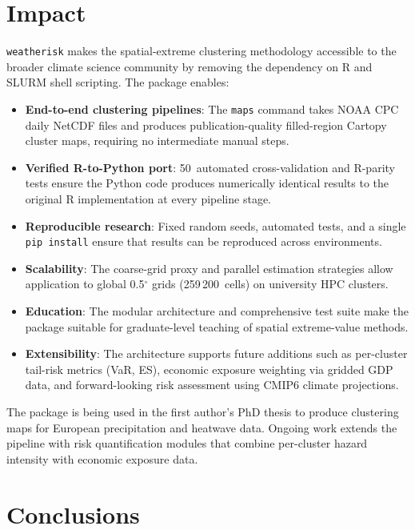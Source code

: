 \documentclass[a4paper]{elsarticle}
\begin{document}
\section{Impact}
\label{sec:impact}

\texttt{weatherisk} makes the spatial-extreme clustering methodology
accessible to the broader climate science community by removing the
dependency on R and SLURM shell scripting.
The package enables:

\begin{itemize}
\item \textbf{End-to-end clustering pipelines}: The \texttt{maps}
  command takes NOAA CPC daily NetCDF files and produces
  publication-quality filled-region Cartopy cluster maps,
  requiring no intermediate manual steps.
\item \textbf{Verified R-to-Python port}: 50~automated
  cross-validation and R-parity tests ensure the Python code
  produces numerically identical results to the original R
  implementation at every pipeline stage.
\item \textbf{Reproducible research}: Fixed random seeds, automated
  tests, and a single \texttt{pip install} ensure that results can
  be reproduced across environments.
\item \textbf{Scalability}: The coarse-grid proxy and parallel
  estimation strategies allow application to global 0.5$^\circ$
  grids (259\,200~cells) on university HPC clusters.
\item \textbf{Education}: The modular architecture and comprehensive
  test suite make the package suitable for graduate-level teaching
  of spatial extreme-value methods.
\item \textbf{Extensibility}: The architecture supports future
  additions such as per-cluster tail-risk metrics (VaR, ES),
  economic exposure weighting via gridded GDP data, and
  forward-looking risk assessment using CMIP6 climate projections.
\end{itemize}

The package is being used in the first author's PhD thesis to produce
clustering maps for European precipitation and heatwave data.
Ongoing work extends the pipeline with risk quantification modules that
combine per-cluster hazard intensity with economic exposure data.

\section{Conclusions}
\label{sec:conclusions}
\end{document}
